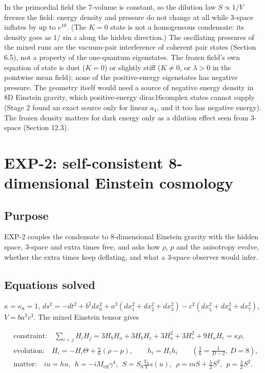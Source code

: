 \documentclass[11pt]{article}
\begin{document}
In the primordial field the 7-volume is constant, so the dilution law $S\propto1/V$ freezes the field: energy density and pressure do not change at all while 3-space inflates by up to $e^{10}$. (The $K=0$ state is not a homogeneous condensate: its density goes as $1/\sin z$ along the hidden direction.) The oscillating pressures of the mixed runs are the vacuum-pair interference of coherent pair states (Section 6.5), not a property of the one-quantum eigenstates. The frozen field's own equation of state is dust ($K=0$) or slightly stiff ($K\ne0$, or $\lambda>0$ in the pointwise mean field); none of the positive-energy eigenstates has negative pressure. The geometry itself would need a source of negative energy density in 8D Einstein gravity, which positive-energy dirac16complex states cannot supply (Stage 2 found an exact source only for linear $a_4$, and it too has negative energy). The frozen density matters for dark energy only as a dilution effect seen from 3-space (Section 12.3).

\section{EXP-2: self-consistent 8-dimensional Einstein cosmology}

\subsection{Purpose}

EXP-2 couples the condensate to 8-dimensional Einstein gravity with the hidden space, 3-space and extra times free, and asks how $\rho$, $p$ and the anisotropy evolve, whether the extra times keep deflating, and what a 3-space observer would infer.

\subsection{Equations solved}

$\kappa=\kappa_8=1$, $ds^2=-dt^2+b^2dx_0^2+a^2(dx_1^2+dx_2^2+dx_3^2)-c^2(dx_5^2+dx_6^2+dx_7^2)$, $V=ba^3c^3$. The mixed Einstein tensor gives

\[
\begin{aligned}
&\text{constraint:}\quad \sum_{i<j}H_iH_j=3H_bH_a+3H_bH_c+3H_a^2+3H_c^2+9H_aH_c=\kappa\rho,\\
&\text{evolution:}\quad \dot H_i=-H_i\Theta+\tfrac{\kappa}{6}(\rho-p),\qquad \dot h_i=H_ih_i\qquad(\tfrac16=\tfrac1{D-2},\ D=8),\\
&\text{matter:}\quad i\dot u=hu,\ \ h=-iM_{\mathrm{eff}}\gamma^4,\ \ S=S_0\frac{V_0}{V}s(u),\ \ \rho=mS+\tfrac\lambda2S^2,\ \ p=\tfrac\lambda2S^2 .
\end{aligned}
\]
\end{document}

